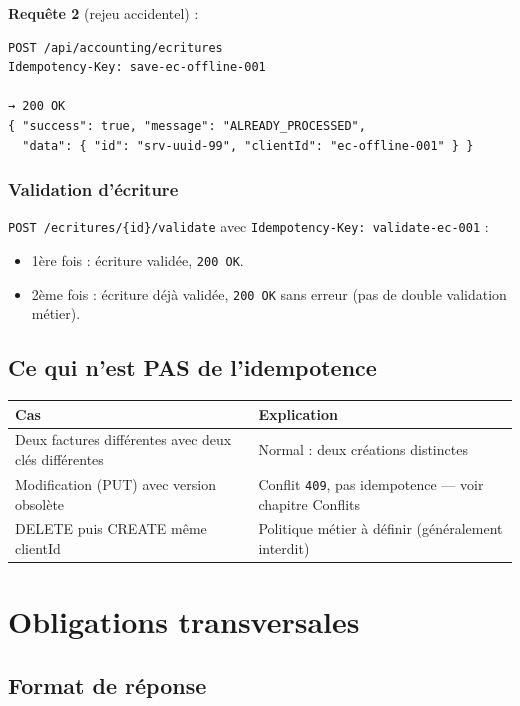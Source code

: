 \documentclass[12pt,a4paper]{report}
\begin{document}
\textbf{Requête 2} (rejeu accidentel) :
\begin{verbatim}
POST /api/accounting/ecritures
Idempotency-Key: save-ec-offline-001

→ 200 OK
{ "success": true, "message": "ALREADY_PROCESSED",
  "data": { "id": "srv-uuid-99", "clientId": "ec-offline-001" } }
\end{verbatim}

\subsection{Validation d'écriture}

\texttt{POST /ecritures/\{id\}/validate} avec \texttt{Idempotency-Key: validate-ec-001} :
\begin{itemize}
  \item 1ère fois : écriture validée, \texttt{200 OK}.
  \item 2ème fois : écriture déjà validée, \texttt{200 OK} sans erreur (pas de double validation métier).
\end{itemize}

\section{Ce qui n'est PAS de l'idempotence}

\begin{longtable}{@{}p{5cm}p{7.5cm}@{}}
\hline
\textbf{Cas} & \textbf{Explication} \\
\hline
\endhead
Deux factures différentes avec deux clés différentes & Normal : deux créations distinctes \\
\hline
Modification (PUT) avec version obsolète & Conflit \texttt{409}, pas idempotence --- voir chapitre Conflits \\
\hline
DELETE puis CREATE même clientId & Politique métier à définir (généralement interdit) \\
\hline
\end{longtable}

\chapter{Obligations transversales}

\section{Format de réponse}
\end{document}
